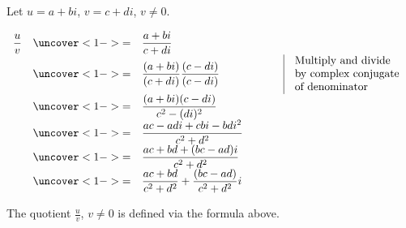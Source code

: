 \begin{frame}
Let $u=a+bi$, $v=c+di$, $v\neq 0$.
\begin{example}
$\begin{array}{rcll|l}
\displaystyle\frac{u}{v}&\uncover<1->{=}& \displaystyle\frac{a+bi}{c+di}~~~~~~~~~~~~~~~~~~~~~~~~~~\\
&\uncover<1->{=}&\displaystyle \frac{(a+bi)}{(c+di)}\frac{(c-di)}{(c-di)} & & \begin{array}{l}
\text{Multiply and divide } \\
\text{by complex conjugate }\\
\text{of denominator}
\end{array}
\\
&\uncover<1->{=}&\displaystyle \frac{(a+bi)(c-di)}{c^2-(di)^2}\\
&\uncover<1->{=}&\displaystyle \frac{ac-adi+cbi-bdi^2}{c^2+d^2}\\
&\uncover<1->{=}&\displaystyle \frac{ac+bd+(bc-ad)i}{c^2+d^2}\\
&\uncover<1->{=}&\displaystyle \frac{ac+bd}{c^2+d^2}+\frac{(bc-ad)}{c^2+d^2}i\\
\end{array}
$
\end{example}
\begin{definition}
The quotient $\frac{u}{v}$, $v\neq 0$ is defined via the formula above.
\end{definition}
\vskip 10cm
\end{frame}